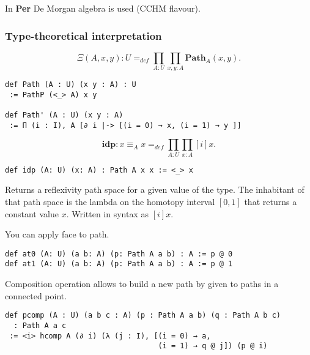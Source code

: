 \documentclass{article}
\begin{document}
In \textbf{Per} De Morgan algebra is used (CCHM flavour).

\subsubsection*{Type-theoretical interpretation}

\begin{definition}
$$
   \Xi(A,x,y) : U =_{def} \prod_{A:U}\prod_{x,y:A} \mathbf{Path}_A(x,y).
$$
\begin{lstlisting}
def Path (A : U) (x y : A) : U
 := PathP (<_> A) x y

def Path' (A : U) (x y : A)
 := Π (i : I), A [∂ i |-> [(i = 0) → x, (i = 1) → y ]]
\end{lstlisting}
\end{definition}

\begin{definition}
$$
   \mathbf{idp} : x \equiv_A x =_{def} \prod_{A:U}\prod_{x:A} [i] x.
$$
\begin{lstlisting}[mathescape=true]
def idp (A: U) (x: A) : Path A x x := <_> x
\end{lstlisting}
Returns a reflexivity path space for a given value of the type.
The inhabitant of that path space is the lambda on the homotopy
interval $[0,1]$ that returns a constant value $x$. Written in
syntax as $[i]x$.
\end{definition}

\begin{definition}
You can apply face to path.
\begin{lstlisting}
def at0 (A: U) (a b: A) (p: Path A a b) : A := p @ 0
def at1 (A: U) (a b: A) (p: Path A a b) : A := p @ 1
\end{lstlisting}
\end{definition}

\begin{definition}
Composition operation allows to build a new path by given to paths
in a connected point.
\begin{center}
\end{center}
\begin{lstlisting}[mathescape=true]
def pcomp (A : U) (a b c : A) (p : Path A a b) (q : Path A b c)
  : Path A a c
 := <i> hcomp A (∂ i) (λ (j : I), [(i = 0) → a,
                                   (i = 1) → q @ j]) (p @ i)
\end{lstlisting}
\end{definition}
\end{document}
